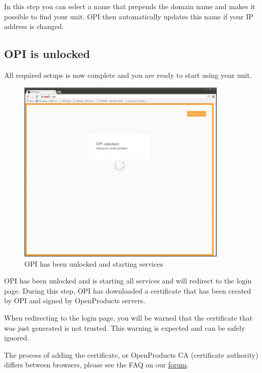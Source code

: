 \documentclass[12pt,a4paper,titlepage]{article}
\begin{document}
In this step you can select a name that prepends the domain name and makes it possible to find your unit. OPI then automatically updates this name if your IP address is changed.

\newpage
\subsection{OPI is unlocked}
All required setups is now complete and you are ready to start using your unit.
\begin{figure}[h!]
\centering
\includegraphics[width=10cm]{./img/unlocked}
\caption{OPI has been unlocked and starting services}
\end{figure}
OPI has been unlocked and is starting all services and will redirect to the login page.
During this step, OPI has downloaded a certificate that has been created by OPI and signed by OpenProducts servers.

When redirecting to the login page, you will be warned that the certificate that was just generated is not trusted. This warning is expected and can be safely ignored.

The process of adding the certificate, or OpenProducts CA (certificate authority) differs between browsers, please see the FAQ on our  \href{http://community.openproducts.com}{forum}. 

\newpage
\end{document}
